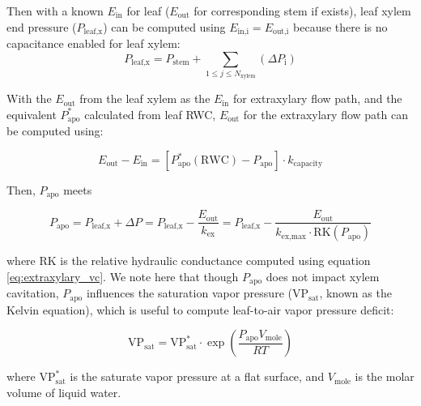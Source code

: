 \documentclass[twoside,10pt]{report}
\begin{document}
\par Then with a known $E_\text{in}$ for leaf ($E_\text{out}$ for corresponding stem if exists), leaf xylem end pressure ($P_\text{leaf,x}$) can be computed using $E_\text{in,i} = E_\text{out,i}$ because there is no capacitance enabled for leaf xylem:
\begin{equation}
    P_\text{leaf,x} = P_\text{stem} + \sum_{1 \leq j \leq N_\text{xylem}} \left( \Delta P_\text{i} \right)
\end{equation}

\par \noindent With the $E_\text{out}$ from the leaf xylem as the $E_\text{in}$ for extraxylary flow path, and the equivalent $P_\text{apo}^{*}$ calculated from leaf RWC, $E_\text{out}$ for the extraxylary flow path can be computed using:

\begin{equation}
    E_\text{out} - E_\text{in} = \left[ P_\text{apo}^{*}(\text{RWC}) - P_\text{apo} \right] \cdot k_\text{capacity}
    \label{eq:flow_profile_apo}
\end{equation}

\par Then, $P_\text{apo}$ meets

\begin{equation}
    P_\text{apo} = P_\text{leaf,x} + \Delta P =
                   P_\text{leaf,x} - \dfrac{E_\text{out}}{k_\text{ex}} = 
                   P_\text{leaf,x} - \dfrac{E_\text{out}}{k_\text{ex,max} \cdot \text{RK}(P_\text{apo})}
\end{equation}

\par \noindent where RK is the relative hydraulic conductance computed using equation \ref{eq:extraxylary_vc}. We note here that though $P_\text{apo}$ does not impact xylem cavitation, $P_\text{apo}$ influences the saturation vapor pressure ($\text{VP}_\text{sat}$, known as the Kelvin equation), which is useful to compute leaf-to-air vapor pressure deficit:

\begin{equation}
    \text{VP}_\text{sat} = \text{VP}_\text{sat}^{*} \cdot \exp \left( \dfrac{P_\text{apo} V_\text{mole}}{RT} \right)
\end{equation}

\par \noindent where $\text{VP}_\text{sat}^{*}$ is the saturate vapor pressure at a flat surface, and $V_\text{mole}$ is the molar volume of liquid water.
\end{document}
